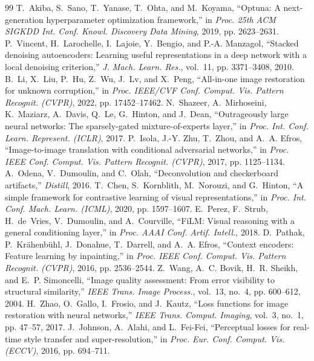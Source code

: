 \documentclass[conference]{IEEEtran}
\begin{document}
\begin{thebibliography}{99}
 T.~Akiba, S.~Sano, T.~Yanase, T.~Ohta, and M.~Koyama, ``Optuna: A next-generation hyperparameter optimization framework,'' in \emph{Proc. 25th ACM SIGKDD Int. Conf. Knowl. Discovery Data Mining}, 2019, pp. 2623--2631.
 P.~Vincent, H.~Larochelle, I.~Lajoie, Y.~Bengio, and P.-A. Manzagol, ``Stacked denoising autoencoders: Learning useful representations in a deep network with a local denoising criterion,'' \emph{J. Mach. Learn. Res.}, vol.~11, pp. 3371--3408, 2010.
 B.~Li, X.~Liu, P.~Hu, Z.~Wu, J.~Lv, and X.~Peng, ``All-in-one image restoration for unknown corruption,'' in \emph{Proc. IEEE/CVF Conf. Comput. Vis. Pattern Recognit. (CVPR)}, 2022, pp. 17452--17462.
 N.~Shazeer, A.~Mirhoseini, K.~Maziarz, A.~Davis, Q.~Le, G.~Hinton, and J.~Dean, ``Outrageously large neural networks: The sparsely-gated mixture-of-experts layer,'' in \emph{Proc. Int. Conf. Learn. Represent. (ICLR)}, 2017.
 P.~Isola, J.-Y. Zhu, T.~Zhou, and A.~A. Efros, ``Image-to-image translation with conditional adversarial networks,'' in \emph{Proc. IEEE Conf. Comput. Vis. Pattern Recognit. (CVPR)}, 2017, pp. 1125--1134.
 A.~Odena, V.~Dumoulin, and C.~Olah, ``Deconvolution and checkerboard artifacts,'' \emph{Distill}, 2016.
 T.~Chen, S.~Kornblith, M.~Norouzi, and G.~Hinton, ``A simple framework for contrastive learning of visual representations,'' in \emph{Proc. Int. Conf. Mach. Learn. (ICML)}, 2020, pp. 1597--1607.
 E.~Perez, F.~Strub, H.~de~Vries, V.~Dumoulin, and A.~Courville, ``FiLM: Visual reasoning with a general conditioning layer,'' in \emph{Proc. AAAI Conf. Artif. Intell.}, 2018.
 D.~Pathak, P.~Kr\"ahenb\"uhl, J.~Donahue, T.~Darrell, and A.~A. Efros, ``Context encoders: Feature learning by inpainting,'' in \emph{Proc. IEEE Conf. Comput. Vis. Pattern Recognit. (CVPR)}, 2016, pp. 2536--2544.
 Z.~Wang, A.~C. Bovik, H.~R. Sheikh, and E.~P. Simoncelli, ``Image quality assessment: From error visibility to structural similarity,'' \emph{IEEE Trans. Image Process.}, vol.~13, no.~4, pp. 600--612, 2004.
 H.~Zhao, O.~Gallo, I.~Frosio, and J.~Kautz, ``Loss functions for image restoration with neural networks,'' \emph{IEEE Trans. Comput. Imaging}, vol.~3, no.~1, pp. 47--57, 2017.
 J.~Johnson, A.~Alahi, and L.~Fei-Fei, ``Perceptual losses for real-time style transfer and super-resolution,'' in \emph{Proc. Eur. Conf. Comput. Vis. (ECCV)}, 2016, pp. 694--711.

\end{thebibliography}
\end{document}
